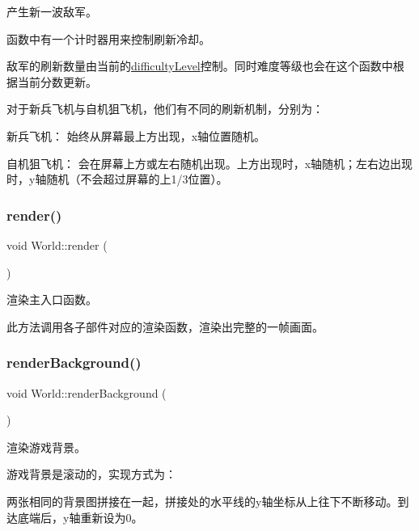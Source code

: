 产生新一波敌军。 

函数中有一个计时器用来控制刷新冷却。

敌军的刷新数量由当前的\hyperlink{class_world_a594e81a86f319eea4e8e5a2029cdaa90}{difficulty\+Level}控制。同时难度等级也会在这个函数中根据当前分数更新。

对于新兵飞机与自机狙飞机，他们有不同的刷新机制，分别为：
\begin{DoxyItemize}
\item 新兵飞机： 始终从屏幕最上方出现，x轴位置随机。
\item 自机狙飞机： 会在屏幕上方或左右随机出现。上方出现时，x轴随机；左右边出现时，y轴随机（不会超过屏幕的上1/3位置）。 
\end{DoxyItemize}\mbox{\label{class_world_a150eab10c21532162bb698d72aecec16}} 
\subsubsection{\texorpdfstring{render()}{render()}}
{\footnotesize\ttfamily void World\+::render (\begin{DoxyParamCaption}{ }\end{DoxyParamCaption})}



渲染主入口函数。 

此方法调用各子部件对应的渲染函数，渲染出完整的一帧画面。 \mbox{\label{class_world_adb9973193b6f45377a3911ed023a9f73}} 
\subsubsection{\texorpdfstring{render\+Background()}{renderBackground()}}
{\footnotesize\ttfamily void World\+::render\+Background (\begin{DoxyParamCaption}{ }\end{DoxyParamCaption})\hspace{0.3cm}{\ttfamily [private]}}



渲染游戏背景。 

游戏背景是滚动的，实现方式为：

两张相同的背景图拼接在一起，拼接处的水平线的y轴坐标从上往下不断移动。到达底端后，y轴重新设为0。 \mbox{\label{class_world_af956580b52927299a0bf200740f8ea0d}} 
